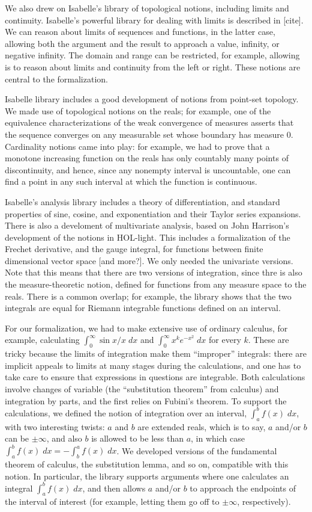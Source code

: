 \documentclass{article}
\begin{document}
We also drew on Isabelle's library of topological notions, including limits and continuity. Isabelle's powerful library for dealing with limits is described in [cite]. We can reason about limits of sequences and functions, in the latter case, allowing both the argument and the result to approach a value, infinity, or negative infinity. The domain and range can be restricted, for example, allowing is to reason about limits and continuity from the left or right. These notions are central to the formalization.

Isabelle library includes a good development of notions from point-set topology. We made use of topological notions on the reals; for example, one of the equivalence characterizations of the weak convergence of measures asserts that the sequence converges on any measurable set whose boundary has measure $0$. Cardinality notions came into play: for example, we had to prove that a monotone increasing function on the reals has only countably many points of discontinuity, and hence, since any nonempty interval is uncountable, one can find a point in any such interval at which the function is continuous. 

Isabelle's analysis library includes a theory of differentiation, and standard properties of sine, cosine, and exponentiation and their Taylor series expansions. There is also a develoment of multivariate analysis, based on John Harrison's development of the notions in HOL-light. This includes a formalization of the Frechet derivative, and the gauge integral, for functions between finite dimensional vector space [and more?]. We only needed the univariate versions. Note that this means that there are two versions of integration, since thre is also the measure-theoretic notion, defined for functions from any measure space to the reals. There is a common overlap; for example, the library shows that the two integrals are equal for Riemann integrable functions defined on an interval.

For our formalization, we had to make extensive use of ordinary calculus, for example, calculating $\int_0^\infty \sin x / x \; dx$ and $\int_0^\infty x^k e^{-x^2} \; dx$ for every $k$. These are tricky because the limits of integration make them ``improper'' integrals: there are implicit appeals to limits at many stages during the calculations, and one has to take care to ensure that expressions in questions are integrable. Both calculations involve changes of variable (the ``substitution theorem'' from calculus) and integration by parts, and the first relies on Fubini's theorem. To support the calculations, we defined the notion of integration over an interval, $\int_a^b f(x) \; dx$, with two interesting twists: $a$ and $b$ are extended reals, which is to say, $a$ and/or $b$ can be $\pm \infty$, and also $b$ is allowed to be less than $a$, in which case $\int_a^b f(x) \; dx = - \int_b^a f(x) \; dx$. We developed versions of the fundamental theorem of calculus, the substitution lemma, and so on, compatible with this notion. In particular, the library supports arguments where one calculates an integral $\int_a^b f(x) \; dx$, and then allows $a$ and/or $b$ to approach the endpoints of the interval of interest (for example, letting them go off to $\pm \infty$, respectively).
\end{document}
